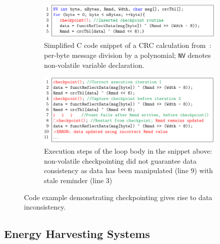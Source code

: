 
\begin{figure}
	\begin{subfigure}[t]{\linewidth}
		\centering \includegraphics[width=\columnwidth]{figures/crc_example}
		\caption{Simplified C code snippet of a CRC calculation from~\cite{hicks_mibench2_2016}: per-byte message division by a polynomial; \texttt{NV} denotes non-volatile variable declaration.}\label{fig:crc_example}
	\end{subfigure}
	\begin{subfigure}[t]{\linewidth}
		\centering \includegraphics[width=\columnwidth]{figures/crc_example_war}
		\caption{Execution steps of the loop body in the snippet above: non-volatile checkpointing did not guarantee data consistency as data has been manipulated (line 9) with stale reminder (line 3)}\label{fig:crc_example_war}
	\end{subfigure}
	\caption{Code example demonstrating checkpointing gives rise to data inconsistency.}\label{fig:code_demo_incosistency}
\end{figure}

\subsection{Energy Harvesting Systems}
\label{sec:background_harvesting}

